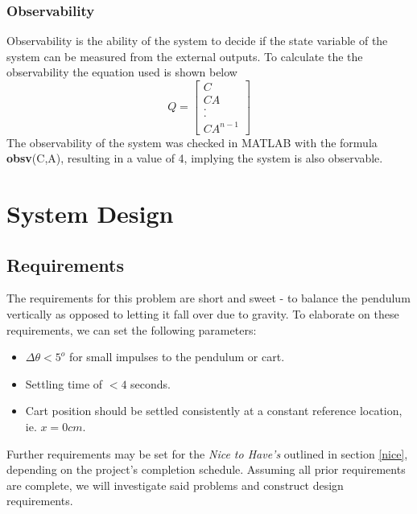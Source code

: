 \documentclass[12pt]{article}
\begin{document}
\subsubsection{Observability}
Observability is the ability of the system to decide if the state variable of the system can be measured from the external outputs. To calculate the the observability the equation used is shown below\\
\begin{equation}
    Q = 
    \begin{bmatrix}
C\\
CA\\
.\\
.\\
CA^{n-1}
    \end{bmatrix}
\end{equation}
The observability of the system was checked in MATLAB with the formula \textbf{obsv}(C,A), resulting in a value of 4, implying the system is also observable.
\section{System Design}
\subsection{Requirements}
The requirements for this problem are short and sweet - to balance the pendulum vertically as opposed to letting it fall over due to gravity. To elaborate on these requirements, we can set the following parameters:
\begin{itemize}
    \item $\Delta \theta < 5^o$ for small impulses to the pendulum or cart.
    \item Settling time of $< 4$ seconds.
    \item Cart position should be settled consistently at a constant reference location, ie. $x=0cm$.
\end{itemize}
Further requirements may be set for the \textit{Nice to Have's} outlined in section \ref{nice}, depending on the project's completion schedule. Assuming all prior requirements are complete, we will investigate said problems and construct design requirements. 
\end{document}
